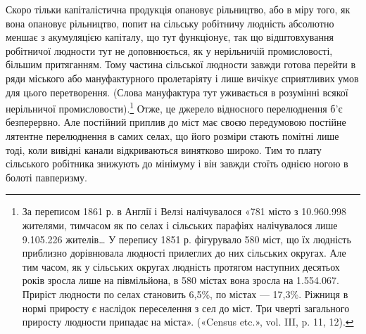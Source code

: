 Скоро тільки капіталістична продукція опановує рільництво, або в міру того, як вона опановує
рільництво, попит на сільську робітничу людність абсолютно меншає з акумуляцією капіталу, що тут
функціонує, так що відштовхування робітничої людности
тут не доповнюється, як у нерільничій промисловості, більшим притяганням. Тому частина сільської
людности завжди готова перейти в ряди міського або мануфактурного пролетаріяту і лише вичікує
сприятливих умов для цього перетворення. (Слова мануфактура тут уживається в розумінні всякої
нерільничої
промисловости).\footnote{
За переписом 1861 р. в Англії і Велзі налічувалося «781 місто з \num{10.960.998} жителями, тимчасом як
по селах і сільських парафіях налічувалося лише \num{9.105.226} жителів\dots{} У перепису 1851 р. фігурувало
580 міст, що їх людність приблизно дорівнювала людності прилеглих до них
сільських округах. Але тим часом, як у сільських округах людність протягом наступних десятьох років
зросла лише на півмільйона, в 580 містах вона зросла на \num{1.554.067}. Приріст людности по селах
становить 6,5\%, по містах — 17,3\%. Ріжниця в нормі приросту є наслідок переселення з сел до міст.
Три чверті загального приросту людности припадає на міста». («Census etc.», vol. III, p. 11, 12).
} Отже, це джерело відносного перелюднення
б’є безперервно. Але постійний приплив до міст має своєю передумовою постійне лятентне перелюднення
в самих селах, що його розміри стають помітні лише тоді, коли вивідні канали відкриваються винятково
широко. Тим то плату сільського робітника
знижують до мінімуму і він завжди стоїть однією ногою в болоті павперизму.

